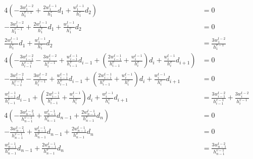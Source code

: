 \documentclass{article}
\begin{document}
\begin{align*}
  4\left(-\frac{3w_1^{t-2}}{h_1^{v-1}}+\frac{2w_1^{t-1}}{h_1^v}d_1+\frac{w_1^{t-1}}{h_1^v}d_2\right)
  &= 0 \\
  -\frac{3w_1^{t-2}}{h_1^{v-1}}+\frac{2w_1^{t-1}}{h_1^v}d_1+\frac{w_1^{t-1}}{h_1^v}d_2
  &= 0 \\
  \frac{2w_1^{t-1}}{h_1^v}d_1+\frac{w_1^{t-1}}{h_1^v}d_2
  &= \frac{3w_1^{t-2}}{h_1^{v-1}} \\
  4\left(
  -\frac{3w_{i-1}^{t-2}}{h_{i-1}^{v-1}}-\frac{3w_i^{t-2}}{h_i^{v-1}}
  +\frac{w_{i-1}^{t-1}}{h_{i-1}^v}d_{i-1}
  +\left(\frac{2w_{i-1}^{t-1}}{h_{i-1}^v}+\frac{w_i^{t-1}}{h_i^v}\right)d_i
  +\frac{w_i^{t-1}}{h_i^v}d_{i+1}
  \right)
  &= 0 \\
  -\frac{3w_{i-1}^{t-2}}{h_{i-1}^{v-1}}-\frac{3w_i^{t-2}}{h_i^{v-1}}
  +\frac{w_{i-1}^{t-1}}{h_{i-1}^v}d_{i-1}
  +\left(\frac{2w_{i-1}^{t-1}}{h_{i-1}^v}+\frac{w_i^{t-1}}{h_i^v}\right)d_i
  +\frac{w_i^{t-1}}{h_i^v}d_{i+1}
  &= 0 \\
  \frac{w_{i-1}^{t-1}}{h_{i-1}^v}d_{i-1}
  +\left(\frac{2w_{i-1}^{t-1}}{h_{i-1}^v}+\frac{w_i^{t-1}}{h_i^v}\right)d_i
  +\frac{w_i^{t-1}}{h_i^v}d_{i+1}
  &= \frac{3w_{i-1}^{t-2}}{h_{i-1}^{v-1}}+\frac{3w_i^{t-2}}{h_i^{v-1}} \\
  4\left(-\frac{3w_{n-1}^{t-2}}{h_{n-1}^{v-1}}+\frac{w_{n-1}^{t-1}}{h_{n-1}^v}d_{n-1}+\frac{2w_{n-1}^{t-1}}{h_{n-1}^v}d_n\right)
  &= 0 \\
  -\frac{3w_{n-1}^{t-2}}{h_{n-1}^{v-1}}+\frac{w_{n-1}^{t-1}}{h_{n-1}^v}d_{n-1}+\frac{2w_{n-1}^{t-1}}{h_{n-1}^v}d_n
  &= 0 \\
  \frac{w_{n-1}^{t-1}}{h_{n-1}^v}d_{n-1}+\frac{2w_{n-1}^{t-1}}{h_{n-1}^v}d_n
  &= \frac{3w_{n-1}^{t-2}}{h_{n-1}^{v-1}} \\
\end{align*}
\end{document}

